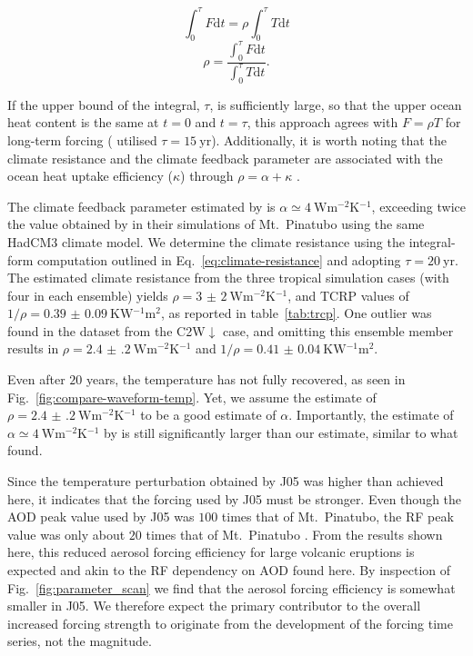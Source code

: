 \documentclass[draft]{agujournal2019}
\newcommand{\cwm}{C2W\(\downarrow\)}
\begin{document}
\begin{equation}
  \int_0^{\tau}F \mathrm{d}t=\rho\int_{0}^{\tau}T \mathrm{d}t
\end{equation}
\begin{equation}
  \rho=\frac{\int_0^{\tau}F \mathrm{d}t}{\int_{0}^{\tau}T \mathrm{d}t}.
  \label{eq:climate-resistance}
\end{equation}

If the upper bound of the integral, \(\tau \), is sufficiently large, so that the upper
ocean heat content is the same at \(t=0\) and \(t=\tau \), this approach agrees with
\(F=\rho T\) for long-term forcing \cite{gregory2016} ( utilised
\(\tau =\SI{15}{\mathrm{yr}}\)). Additionally, it is worth noting that the climate
resistance and the climate feedback parameter are associated with the ocean heat uptake
efficiency (\(\kappa \)) through \(\rho =\alpha +\kappa \) \cite{gregory2016}.

The climate feedback parameter estimated by  is \(\alpha \simeq
\SI{4}{\watt\metre^{-2}\kelvin^{-1}}\), exceeding twice the value obtained by
 in their simulations of Mt.\ Pinatubo using the same HadCM3 climate
model. We determine the climate resistance using the integral-form computation outlined
in Eq.~\ref{eq:climate-resistance} and adopting \(\tau =\SI{20}{\mathrm{yr}}\). The
estimated climate resistance from the three tropical simulation cases (with four in each
ensemble) yields \(\rho =\SI{3(2)}{\watt\metre^{-2}\kelvin^{-1}}\), and TCRP
values of \(1/\rho=\SI{0.39(9)}{\kelvin\watt^{-1}\metre^{2}}\), as reported in
table~\ref{tab:trcp}. One outlier was found in the dataset from the \cwm{} case, and
omitting this ensemble member results in \(\rho
=\SI{2.4(2)}{\watt\metre^{-2}\kelvin^{-1}}\) and \(1/\rho
=\SI{0.41(4)}{\kelvin\watt^{-1}\metre^{2}}\).

Even after \(20\) years, the temperature has not fully recovered, as seen in
Fig.~\ref{fig:compare-waveform-temp}. Yet, we assume the estimate of \(\rho
=\SI{2.4(2)}{\watt\metre^{-2}\kelvin^{-1}}\) to be a good estimate of \(\alpha \).
Importantly, the estimate of \(\alpha \simeq \SI{4}{\watt\metre^{-2}\kelvin^{-1}}\) by
 is still significantly larger than our estimate, similar to what
 found.

Since the temperature perturbation obtained by J05 was higher than achieved here,
it indicates that the forcing used by J05 must be stronger. Even though the
AOD peak value used by J05 was \(100\) times that of Mt.\ Pinatubo, the
RF peak value was only about \(20\) times that of Mt.\ Pinatubo
\cite{gregory2016}. From the results shown here, this reduced aerosol forcing
efficiency for large volcanic eruptions is expected and akin to the RF dependency
on AOD found here. By inspection of Fig.~\ref{fig:parameter_scan} we find that the
aerosol forcing efficiency is somewhat smaller in J05. We therefore expect the
primary contributor to the overall increased forcing strength to originate from the
development of the forcing time series, not the magnitude.
\end{document}
